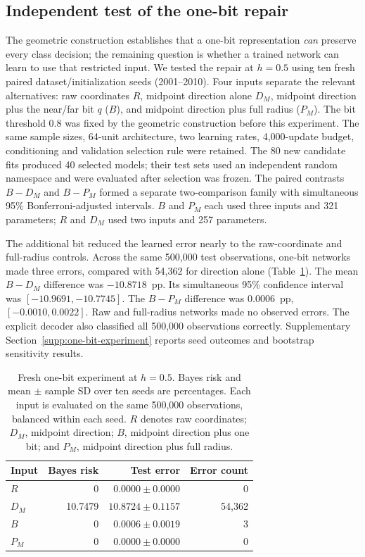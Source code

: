 \subsection{Independent test of the one-bit repair}
\label{sec:one-bit-experiment}
The geometric construction establishes that a one-bit representation \emph{can} preserve every class decision; the remaining question is whether a trained network can learn to use that restricted input. We tested the repair at $h=0.5$ using ten fresh paired dataset/initialization seeds (2001--2010). Four inputs separate the relevant alternatives: raw coordinates $R$, midpoint direction alone $D_M$, midpoint direction plus the near/far bit $q$ ($B$), and midpoint direction plus full radius ($P_M$). The bit threshold $0.8$ was fixed by the geometric construction before this experiment. The same sample sizes, 64-unit architecture, two learning rates, 4,000-update budget, conditioning and validation selection rule were retained. The 80 new candidate fits produced 40 selected models; their test sets used an independent random namespace and were evaluated after selection was frozen. The paired contrasts $B-D_M$ and $B-P_M$ formed a separate two-comparison\vadjust{\nobreak} family with simultaneous 95\% Bonferroni-adjusted intervals. $B$ and $P_M$ each used three inputs and 321 parameters; $R$ and $D_M$ used two inputs and 257 parameters.

The additional bit reduced the learned error nearly to the raw-coordinate and full-radius controls. Across the same 500,000 test observations, one-bit networks made three errors, compared with 54,362 for direction alone (Table~\ref{tab:one-bit-neural}). The mean $B-D_M$ difference was $-10.8718$~pp. Its simultaneous 95\% confidence interval was $[-10.9691,-10.7745]$. The $B-P_M$ difference was $0.0006$~pp, $[-0.0010,0.0022]$. Raw and full-radius networks made no observed errors. The explicit decoder also classified all 500,000 observations correctly. Supplementary Section~\ref{supp:one-bit-experiment} reports seed outcomes and bootstrap sensitivity results.

\begin{table}[t]
\centering\small
\setlength{\tabcolsep}{3pt}
\caption{Fresh one-bit experiment at $h=0.5$. Bayes risk and mean $\pm$ sample SD over ten seeds are percentages. Each input is evaluated on the same 500,000 observations, balanced within each seed. $R$ denotes raw coordinates; $D_M$, midpoint direction; $B$, midpoint direction plus one bit; and $P_M$, midpoint direction plus full radius.}
\label{tab:one-bit-neural}
\begin{tabular}{lrrr}
\toprule
Input & Bayes risk & Test error & Error count \\
\midrule
$R$ & 0 & $0.0000\pm0.0000$ & 0 \\
$D_M$ & 10.7479 & $10.8724\pm0.1157$ & 54,362 \\
$B$ & 0 & $0.0006\pm0.0019$ & 3 \\
$P_M$ & 0 & $0.0000\pm0.0000$ & 0 \\
\bottomrule
\end{tabular}
\end{table}
